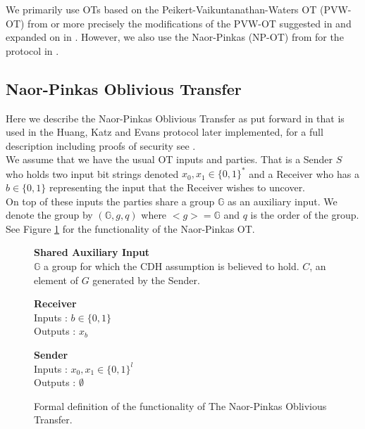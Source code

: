 \documentclass[ %
                    author={Nicholas Tutte},
                supervisor={Prof. Nigel Smart},
                    degree={MEng},
                     title={Secure Two Party Computation},
                  subtitle={A practical comparison of recent protocols},
                      type={Research - GG1K},
                      year={2015} ]{dissertation}
\begin{document}
			We primarily use OTs based on the Peikert-Vaikuntanathan-Waters OT (PVW-OT) from \cite{PVW_OT_2008} or more precisely the modifications of the PVW-OT suggested in \cite{LindellAndPinkas2011} and expanded on in \cite{Lindell_CnC_2013}. However, we also use the Naor-Pinkas (NP-OT) from \cite{NaorPinkasOT2001} for the protocol in \cite{Katz_Symm_CnC_2013}.


			\subsection{Naor-Pinkas Oblivious Transfer} \label{sub:NaorPinkasOT}

				Here we describe the Naor-Pinkas Oblivious Transfer as put forward in \cite{Katz_Symm_CnC_2013} that is used in the Huang, Katz and Evans protocol later implemented, for a full description including proofs of security see \cite{NaorPinkasOT2001}.\\

				We assume that we have the usual OT inputs and parties. That is a Sender $S$ who holds two input bit strings denoted $x_0, x_1 \in \{0, 1\}^*$ and a Receiver who has a $b \in \{0, 1\}$ representing the  input that the Receiver wishes to uncover.\\

				On top of these inputs the parties share a group $\mathbb{G}$ as an auxiliary input. We denote the group by $(\mathbb{G}, g, q)$ where $<g> = \mathbb{G}$ and $q$ is the order of the group.\\ %

				See Figure \ref{fig:NPOT_Functionality} for the functionality of the Naor-Pinkas OT.\\


				\begin{figure}[!htb]
					\centering
					
					\textbf{Shared Auxiliary Input}\\
					$\mathbb{G}$ a group for which the CDH assumption is believed to hold. $C$, an element of $G$ generated by the Sender.\\
					\vspace{0.3cm}
					\begin{minipage}{0.45\textwidth}
						\centering
						\textbf{Receiver}\\
						Inputs : $b \in \{0, 1\}$\\
						Outputs : $x_b$\\
					\end{minipage}
					\begin{minipage}{0.45\textwidth}
						\centering
						\textbf{Sender}\\
						Inputs : $x_0, x_1 \in \{0, 1\}^l$\\
						Outputs : $\emptyset$\\
					\end{minipage}

					\caption{ Formal definition of the functionality of The Naor-Pinkas Oblivious Transfer.\label{fig:NPOT_Functionality}}
				\end{figure}
\end{document}
